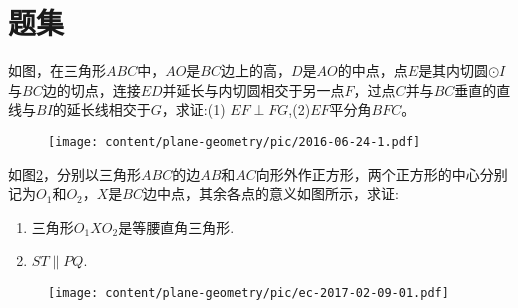 
\section{题集}

\begin{exercise}
\label{exercise:2016-06-24-1}
  如图，在三角形$ABC$中，$AO$是$BC$边上的高，$D$是$AO$的中点，点$E$是其内切圆$\odot I$与$BC$边的切点，连接$ED$并延长与内切圆相交于另一点$F$，过点$C$并与$BC$垂直的直线与$BI$的延长线相交于$G$，求证:(1) $EF \perp FG$,(2)$EF$平分角$BFC$。
\end{exercise}
\begin{figure}[htbp]
  \centering
\texttt{[image: content/plane-geometry/pic/2016-06-24-1.pdf]}
\caption{}
\label{fig:2016-06-24-1}
\end{figure}

\begin{exercise}
  \label{ec:2017-02-09-01}
  如图\ref{fig:2017-02-09-01-01}，分别以三角形$ABC$的边$AB$和$AC$向形外作正方形，两个正方形的中心分别记为$O_{1}$和$O_{2}$，$X$是$BC$边中点，其余各点的意义如图所示，求证:
  \begin{enumerate}
  \item 三角形$O_{1}XO_{2}$是等腰直角三角形.
  \item $ST \parallel PQ$.
  \end{enumerate}
\end{exercise}

\begin{figure}[htbp]
  \centering
\texttt{[image: content/plane-geometry/pic/ec-2017-02-09-01.pdf]}
\caption{}
\label{fig:2017-02-09-01-01}
\end{figure}
  

